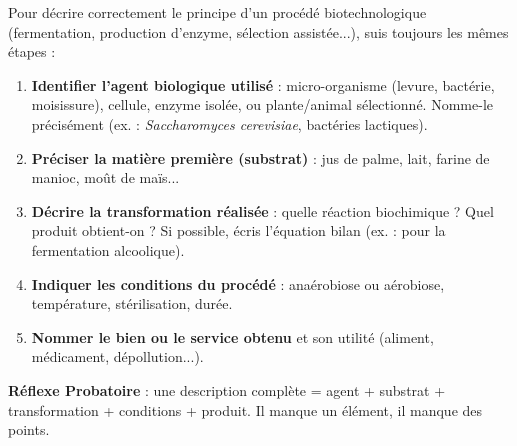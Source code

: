 \documentclass[11pt]{article}
\begin{document}
\begin{methode}
Pour décrire correctement le principe d'un procédé biotechnologique (fermentation, production d'enzyme, sélection assistée...), suis toujours les mêmes étapes :
\begin{enumerate}
\item \textbf{Identifier l'agent biologique utilisé} : micro-organisme (levure, bactérie, moisissure), cellule, enzyme isolée, ou plante/animal sélectionné. Nomme-le précisément (ex. : \emph{Saccharomyces cerevisiae}, bactéries lactiques).
\item \textbf{Préciser la matière première (substrat)} : jus de palme, lait, farine de manioc, moût de maïs...
\item \textbf{Décrire la transformation réalisée} : quelle réaction biochimique ? Quel produit obtient-on ? Si possible, écris l'équation bilan (ex. :  pour la fermentation alcoolique).
\item \textbf{Indiquer les conditions du procédé} : anaérobiose ou aérobiose, température, stérilisation, durée.
\item \textbf{Nommer le bien ou le service obtenu} et son utilité (aliment, médicament, dépollution...).
\end{enumerate}
\textbf{Réflexe Probatoire} : une description complète = agent + substrat + transformation + conditions + produit. Il manque un élément, il manque des points.
\end{methode}
\end{document}

